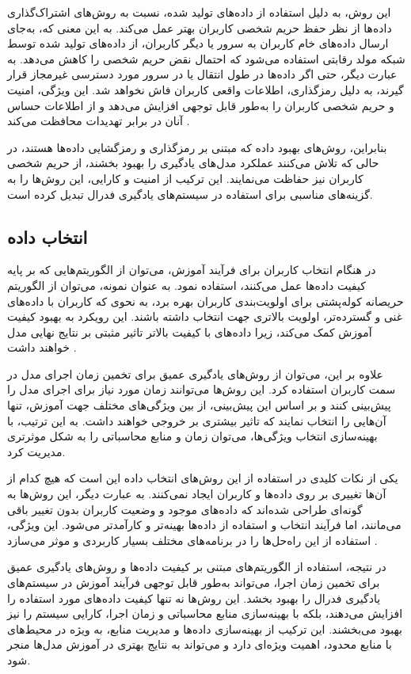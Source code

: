 این روش، به دلیل استفاده از داده‌های تولید شده، نسبت به روش‌های اشتراک‌گذاری داده‌ها از نظر حفظ حریم شخصی کاربران بهتر عمل می‌کند. به این معنی که، به‌جای ارسال داده‌های خام کاربران به سرور یا دیگر کاربران، از داده‌های تولید شده توسط شبکه مولد رقابتی استفاده می‌شود که احتمال نقض حریم شخصی را کاهش می‌دهد.
به عبارت دیگر، حتی اگر داده‌ها در طول انتقال یا در سرور مورد دسترسی غیرمجاز قرار گیرند، به دلیل رمزگذاری، اطلاعات واقعی کاربران فاش نخواهد شد. این ویژگی، امنیت و حریم شخصی کاربران را به‌طور قابل توجهی افزایش می‌دهد و از اطلاعات حساس آنان در برابر تهدیدات محافظت می‌کند
\cite{jeong2018communication}.

بنابراین، روش‌های بهبود داده که مبتنی بر رمزگذاری و رمزگشایی داده‌ها هستند،
در حالی که تلاش می‌کنند عملکرد مدل‌های یادگیری را بهبود بخشند،
از حریم شخصی کاربران نیز حفاظت می‌نمایند. این ترکیب از امنیت و کارایی، این روش‌ها را به گزینه‌های مناسبی برای استفاده در سیستم‌های یادگیری فدرال تبدیل کرده است.


\subsection{انتخاب داده}
در هنگام انتخاب کاربران برای فرآیند آموزش، می‌توان از الگوریتم‌هایی که بر پایه کیفیت داده‌ها عمل می‌کنند، استفاده نمود. به عنوان نمونه، می‌توان از الگوریتم حریصانه کوله‌پشتی برای اولویت‌بندی کاربران بهره برد، به نحوی که کاربران با داده‌های غنی و گسترده‌تر، اولویت بالاتری جهت انتخاب داشته باشند. این رویکرد به بهبود کیفیت آموزش کمک می‌کند، زیرا داده‌های با کیفیت بالاتر تاثیر مثبتی بر نتایج نهایی مدل خواهند داشت
\cite{taik2021data}.

علاوه بر این، می‌توان از روش‌های یادگیری عمیق برای تخمین زمان اجرای مدل در سمت کاربران استفاده کرد. این روش‌ها می‌توانند زمان مورد نیاز برای اجرای مدل را پیش‌بینی کنند و بر اساس این پیش‌بینی، از بین ویژگی‌های مختلف جهت آموزش، تنها آن‌هایی را انتخاب نمایند که تاثیر بیشتری بر خروجی خواهند داشت. به این ترتیب، با بهینه‌سازی انتخاب ویژگی‌ها، می‌توان زمان و منابع محاسباتی را به شکل موثرتری مدیریت کرد.

یکی از نکات کلیدی در استفاده از این روش‌های انتخاب داده این است که هیچ کدام از آن‌ها تغییری بر روی داده‌ها و کاربران ایجاد نمی‌کنند. به عبارت دیگر، این روش‌ها به گونه‌ای طراحی شده‌اند که داده‌های موجود و وضعیت کاربران بدون تغییر باقی می‌مانند، اما فرآیند انتخاب و استفاده از داده‌ها بهینه‌تر و کارآمدتر می‌شود. این ویژگی، استفاده از این راه‌حل‌ها را در برنامه‌های مختلف بسیار کاربردی و موثر می‌سازد
\cite{zeng2022local}.

در نتیجه، استفاده از الگوریتم‌های مبتنی بر کیفیت داده‌ها و روش‌های یادگیری عمیق برای تخمین زمان اجرا، می‌تواند به‌طور قابل توجهی فرآیند آموزش در سیستم‌های یادگیری فدرال را بهبود بخشد. این روش‌ها نه تنها کیفیت داده‌های مورد استفاده را افزایش می‌دهند، بلکه با بهینه‌سازی منابع محاسباتی و زمان اجرا، کارایی سیستم را نیز بهبود می‌بخشند. این ترکیب از بهینه‌سازی داده‌ها و مدیریت منابع، به ویژه در محیط‌های با منابع محدود، اهمیت ویژه‌ای دارد و می‌تواند به نتایج بهتری در آموزش مدل‌ها منجر شود.


